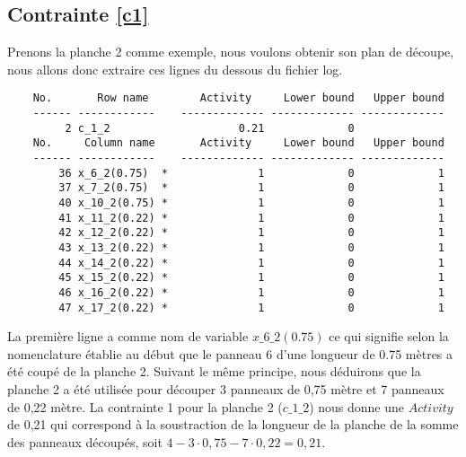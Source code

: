 \documentclass{article}[A4]
\begin{document}
\subsection{Contrainte \ref{c1}}
Prenons la planche 2 comme exemple, nous voulons obtenir son plan de 
découpe, nous allons donc extraire ces lignes du dessous du fichier log.
\begin{verbatim}
	No.       Row name        Activity     Lower bound   Upper bound
	------ ------------    ------------- ------------- -------------
	     2 c_1_2                    0.21             0               
	No.     Column name       Activity     Lower bound   Upper bound
	------ ------------    ------------- ------------- -------------
	    36 x_6_2(0.75)  *              1             0             1 
	    37 x_7_2(0.75)  *              1             0             1 
	    40 x_10_2(0.75) *              1             0             1 
	    41 x_11_2(0.22) *              1             0             1 
	    42 x_12_2(0.22) *              1             0             1 
	    43 x_13_2(0.22) *              1             0             1 
	    44 x_14_2(0.22) *              1             0             1 
	    45 x_15_2(0.22) *              1             0             1 
	    46 x_16_2(0.22) *              1             0             1 
	    47 x_17_2(0.22) *              1             0             1 

\end{verbatim}
La première ligne a comme nom de variable \texttt{$x\_6\_2(0.75)$} ce 
qui signifie selon la nomenclature établie au début que le panneau 6 
d'une longueur de 0.75 mètres a été coupé de la planche 2. Suivant le 
même principe, nous déduirons que la planche 2 a été utilisée pour 
découper 3 panneaux de 0,75 mètre et 7 panneaux de 0,22 mètre. La 
contrainte 1 pour la planche 2 (\texttt{$c\_1\_2$}) nous donne une 
$Activity$ de 0,21 qui correspond à la soustraction de la longueur de 
la planche de la somme des panneaux découpés, soit $4 - 3 \cdot 0,75 - 
7 \cdot 0,22 = 0,21$.
\end{document}

